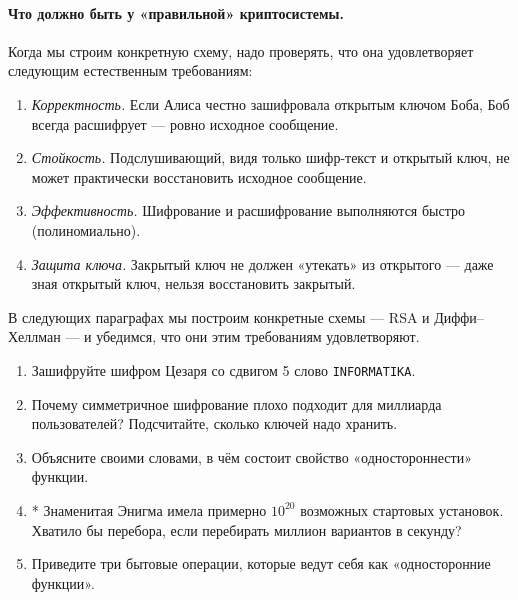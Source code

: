 \paragraph*{Что должно быть у «правильной» криптосистемы.} Когда мы строим конкретную схему, надо проверять, что она удовлетворяет следующим естественным требованиям:
\begin{enumerate}
  \item \emph{Корректность.} Если Алиса честно зашифровала открытым ключом Боба, Боб всегда расшифрует --- ровно исходное сообщение.
  \item \emph{Стойкость.} Подслушивающий, видя только шифр-текст и открытый ключ, не может практически восстановить исходное сообщение.
  \item \emph{Эффективность.} Шифрование и расшифрование выполняются быстро (полиномиально).
  \item \emph{Защита ключа.} Закрытый ключ не должен «утекать» из открытого --- даже зная открытый ключ, нельзя восстановить закрытый.
\end{enumerate}

В следующих параграфах мы построим конкретные схемы --- RSA и Диффи--Хеллман --- и убедимся, что они этим требованиям удовлетворяют.

\begin{tasksbox}
\begin{enumerate}
  \item Зашифруйте шифром Цезаря со сдвигом 5 слово \texttt{INFORMATIKA}.
  \item Почему симметричное шифрование плохо подходит для миллиарда пользователей? Подсчитайте, сколько ключей надо хранить.
  \item Объясните своими словами, в чём состоит свойство «одностороннести» функции.
  \item* Знаменитая Энигма имела примерно $10^{20}$ возможных стартовых установок. Хватило бы перебора, если перебирать миллион вариантов в секунду?
  \item Приведите три бытовые операции, которые ведут себя как «односторонние функции».
\end{enumerate}
\end{tasksbox}
